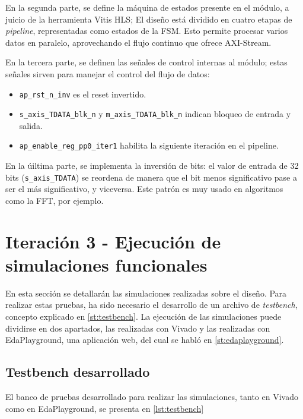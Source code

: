 En la segunda parte, se define la máquina de estados presente en el módulo, a juicio de la herramienta Vitis HLS; El diseño está dividido en cuatro etapas de \textit{pipeline}, representadas como estados de la FSM. Esto permite procesar varios datos en paralelo, aprovechando el flujo continuo que ofrece AXI-Stream.

En la tercera parte, se definen las señales de control internas al módulo; estas señales sirven para manejar el control del flujo de datos:
\begin{itemize}
  \item \texttt{ap\_rst\_n\_inv} es el reset invertido.
  \item \texttt{s\_axis\_TDATA\_blk\_n} y \texttt{m\_axis\_TDATA\_blk\_n} indican bloqueo de entrada y salida.
  \item \texttt{ap\_enable\_reg\_pp0\_iter1} habilita la siguiente iteración en el pipeline.
\end{itemize}

En la úiltima parte, se implementa la inversión de bits: el valor de entrada de 32 bits (\texttt{s\_axis\_TDATA}) se reordena de manera que el bit menos significativo pase a ser el más significativo, y viceversa. Este patrón es muy usado en algoritmos como la \ac{FFT}, por ejemplo.


\section{Iteración 3 - Ejecución de simulaciones funcionales}
En esta sección se detallarán las simulaciones realizadas sobre el diseño. Para realizar estas pruebas, ha sido necesario el desarrollo de un archivo de \emph{testbench}, concepto explicado en \ref{st:testbench}. La ejecución de las simulaciones puede dividirse en dos apartados, las realizadas con Vivado y las realizadas con EdaPlayground, una aplicación web, del cual se habló en \ref{st:edaplayground}.

\subsection{Testbench desarrollado}
El banco de pruebas desarrollado para realizar las simulaciones, tanto en Vivado como en EdaPlayground, se presenta en \ref{lst:testbench}

